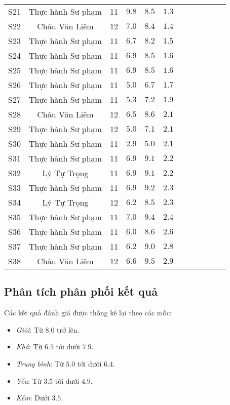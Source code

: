 \begin{longtable}{ScSlScScScSc}
	S21 & Thực hành Sư phạm & 11 & $9.8$ & $8.5$ & $1.3$ \\
	S22 & Châu Văn Liêm     & 12 & $7.0$ & $8.4$ & $1.4$ \\
	S23 & Thực hành Sư phạm & 11 & $6.7$ & $8.2$ & $1.5$ \\
	S24 & Thực hành Sư phạm & 11 & $6.9$ & $8.5$ & $1.6$ \\
	S25 & Thực hành Sư phạm & 11 & $6.9$ & $8.5$ & $1.6$ \\
	S26 & Thực hành Sư phạm & 11 & $5.0$ & $6.7$ & $1.7$ \\
	S27 & Thực hành Sư phạm & 11 & $5.3$ & $7.2$ & $1.9$ \\
	S28 & Châu Văn Liêm     & 12 & $6.5$ & $8.6$ & $2.1$ \\
	S29 & Thực hành Sư phạm & 12 & $5.0$ & $7.1$ & $2.1$ \\
	S30 & Thực hành Sư phạm & 11 & $2.9$ & $5.0$ & $2.1$ \\
	S31 & Thực hành Sư phạm & 11 & $6.9$ & $9.1$ & $2.2$ \\
	S32 & Lý Tự Trọng       & 11 & $6.9$ & $9.1$ & $2.2$ \\
	S33 & Thực hành Sư phạm & 11 & $6.9$ & $9.2$ & $2.3$ \\
	S34 & Lý Tự Trọng       & 12 & $6.2$ & $8.5$ & $2.3$ \\
	S35 & Thực hành Sư phạm & 11 & $7.0$ & $9.4$ & $2.4$ \\
	S36 & Thực hành Sư phạm & 11 & $6.0$ & $8.6$ & $2.6$ \\
	S37 & Thực hành Sư phạm & 11 & $6.2$ & $9.0$ & $2.8$ \\
	S38 & Châu Văn Liêm     & 12 & $6.6$ & $9.5$ & $2.9$ \\
\end{longtable}\par

\subsection{Phân tích phân phối kết quả}

Các kết quả đánh giá được thống kê lại theo các mốc: \begin{itemize}
	\item \textit{Giỏi}: Từ $8.0$ trở lên.
	\item \textit{Khá}: Từ $6.5$ tới dưới $7.9$.
	\item \textit{Trung bình}: Từ $5.0$ tới dưới $6.4$.
	\item \textit{Yếu}: Từ $3.5$ tới dưới $4.9$.
	\item \textit{Kém}: Dưới $3.5$.
\end{itemize}\par

